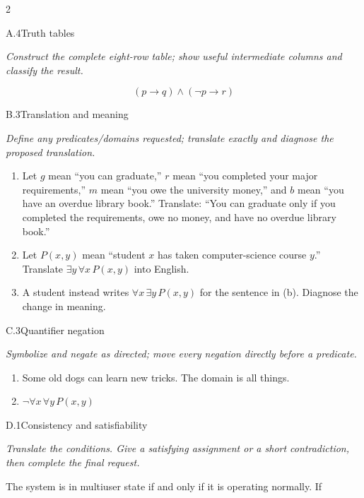 \documentclass[9pt]{extarticle}
\begin{document}
\CoreWorkArea
\FormBreak
{}
\begin{multicols}{2}
\begin{CoreProblem}{A.4}{Truth tables}
{\scriptsize\textit{Construct the complete eight-row table; show useful intermediate columns and classify the result.}\par}
\[
  (p\to q)\land(\neg p\to r)
\]
\end{CoreProblem}
\begin{CoreProblem}{B.3}{Translation and meaning}
{\scriptsize\textit{Define any predicates/domains requested; translate exactly and diagnose the proposed translation.}\par}
\begin{enumerate}[label=(\alph*)]
  \item Let $g$ mean ``you can graduate,'' $r$ mean ``you completed your major
        requirements,'' $m$ mean ``you owe the university money,'' and $b$
        mean ``you have an overdue library book.'' Translate: ``You can
        graduate only if you completed the requirements, owe no money, and
        have no overdue library book.''
  \item Let $P(x,y)$ mean ``student $x$ has taken computer-science course
        $y$.'' Translate $\exists y\,\forall x\,P(x,y)$ into English.
  \item A student instead writes $\forall x\,\exists y\,P(x,y)$ for the
        sentence in (b). Diagnose the change in meaning.
\end{enumerate}
\end{CoreProblem}
\begin{CoreProblem}{C.3}{Quantifier negation}
{\scriptsize\textit{Symbolize and negate as directed; move every negation directly before a predicate.}\par}
\begin{enumerate}[label=(\alph*)]
  \item Some old dogs can learn new tricks. The domain is all things.
  \item $\neg\forall x\,\forall y\,P(x,y)$
\end{enumerate}
\end{CoreProblem}
\columnbreak
\begin{CoreProblem}{D.1}{Consistency and satisfiability}
{\scriptsize\textit{Translate the conditions. Give a satisfying assignment or a short contradiction, then complete the final request.}\par}
The system is in multiuser state if and only if it is operating normally. If

\end{CoreProblem}
\end{multicols}
\end{document}
